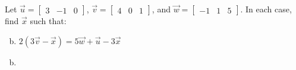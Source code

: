 \documentclass[../main.tex]{subfiles}
\begin{document}
Let
$\vec{u} = \begin{bmatrix}3&-1&0\end{bmatrix}$,
$\vec{v} = \begin{bmatrix}4&0&1\end{bmatrix}$, and
$\vec{w} = \begin{bmatrix}-1&1&5\end{bmatrix}$.
In each case, find $\vec{x}$ such that:
\begin{enumerate}[a)]
	\setcounter{enumi}{1}
	\item $2(3\vec{v} - \vec{x}) = 5\vec{w} + \vec{u} - 3\vec{x}$
\end{enumerate}

\solution
\begin{enumerate}[a)]
	\setcounter{enumi}{1}
	\item 
\end{enumerate}
\end{document}
